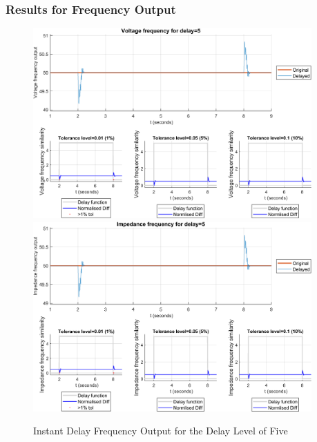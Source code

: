 \subsubsection{Results for Frequency Output}


\begin{figure}
    \caption{Instant Delay Frequency Output for the Delay Level of Five}
    \includegraphics[width=0.95\textwidth]{PMUsim-figures/DelayOf_5/Instant_vFrequency.png}    
    \label{fig:PMUsim_Five_vFrequency}
    \includegraphics[width=0.95\textwidth]{PMUsim-figures/DelayOf_5/Instant_iFrequency.png}    
    \label{fig:PMUsim_Five_Frequency}
        \begin{small}
     \end{small}
\end{figure}


